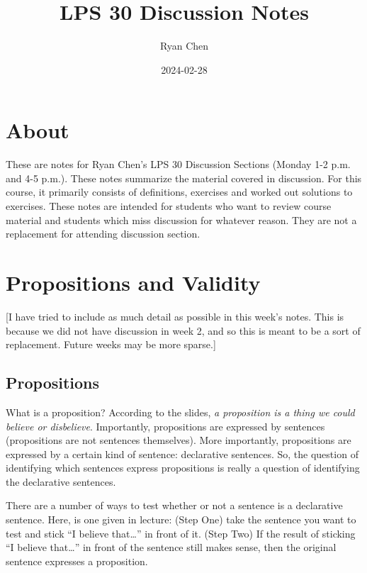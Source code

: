 \documentclass[
]{book}
\title{LPS 30 Discussion Notes}
\author{Ryan Chen}
\date{2024-02-28}
\begin{document}
\maketitle

{
\setcounter{tocdepth}{1}
\tableofcontents
}
\hypertarget{about}{%
\chapter{About}\label{about}}

These are notes for Ryan Chen's LPS 30 Discussion Sections (Monday 1-2 p.m. and 4-5 p.m.). These notes summarize the material covered in discussion. For this course, it primarily consists of definitions, exercises and worked out solutions to exercises. These notes are intended for students who want to review course material and students which miss discussion for whatever reason. They are not a replacement for attending discussion section.

\hypertarget{propositions-and-validity}{%
\chapter{Propositions and Validity}\label{propositions-and-validity}}

{[}I have tried to include as much detail as possible in this week's notes. This is because we did not have discussion in week 2, and so this is meant to be a sort of replacement. Future weeks may be more sparse.{]}

\hypertarget{propositions}{%
\section{Propositions}\label{propositions}}

What is a proposition? According to the slides, \emph{a proposition is a thing we could believe or disbelieve}. Importantly, propositions are expressed by sentences (propositions are not sentences themselves). More importantly, propositions are expressed by a certain kind of sentence: declarative sentences. So, the question of identifying which sentences express propositions is really a question of identifying the declarative sentences.

There are a number of ways to test whether or not a sentence is a declarative sentence. Here, is one given in lecture: (Step One) take the sentence you want to test and stick ``I believe that\ldots{}'' in front of it. (Step Two) If the result of sticking ``I believe that\ldots{}'' in front of the sentence still makes sense, then the original sentence expresses a proposition.
\end{document}
